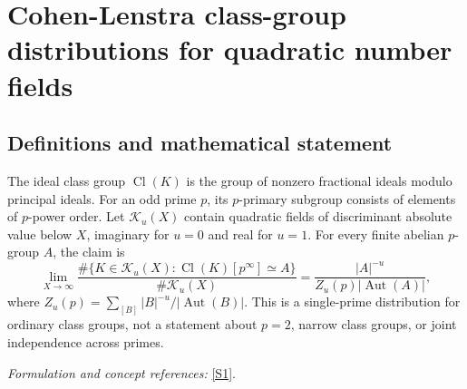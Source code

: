 \documentclass[11pt,a4paper]{article}
\newcommand{\sref}[2]{\hyperlink{source:#1:#2}{[S#2]}}
\newif\ifshowcatalogue
\newcommand{\cataloguescope}[1]{\ifshowcatalogue
 \paragraph{Exact scope in the supplied catalogue.}
 \begin{quote}\small #1\end{quote}\fi}
\numberwithin{equation}{section}
\begin{document}
\setcounter{section}{115}
\clearpage
\section{\texorpdfstring{Cohen-Lenstra class-group distributions for quadratic number fields}{Cohen-Lenstra class-group distributions for quadratic number fields}}\label{116}
\subsection{Definitions and mathematical statement}
The ideal class group $\operatorname{Cl}(K)$ is the group of nonzero fractional ideals modulo principal ideals. For an odd prime $p$, its $p$-primary subgroup consists of elements of $p$-power order. Let $\mathcal K_u(X)$ contain quadratic fields of discriminant absolute value below $X$, imaginary for $u=0$ and real for $u=1$. For every finite abelian $p$-group $A$, the claim is
\[
 \lim_{X\to\infty}\frac{\#\{K\in\mathcal K_u(X):\operatorname{Cl}(K)[p^\infty]\simeq A\}}
 {\#\mathcal K_u(X)}=\frac{|A|^{-u}}{Z_u(p)|\operatorname{Aut}(A)|},
\]
where $Z_u(p)=\sum_{[B]}|B|^{-u}/|\operatorname{Aut}(B)|$. This is a single-prime distribution for ordinary class groups, not a statement about $p=2$, narrow class groups, or joint independence across primes.
\par\smallskip\textit{Formulation and concept references:} \sref{116}{1}.
\cataloguescope{For u in \{0,1\} let K\_u(X) be the set of isomorphism classes of quadratic number fields K with |disc(K)| < X that are imaginary (u = 0) or real (u = 1). For each fixed odd prime p and each finite abelian p-group A, prove that the limit as X tends to infinity of \#\{K in K\_u(X) : Cl(K)[p\textasciicircum{}infinity] is isomorphic to A\} / \#K\_u(X) exists and equals (1/Z\_u(p)) * |A|\textasciicircum{}\{-u\} / |Aut(A)|, where Z\_u(p) is the sum over isomorphism classes of finite abelian p-groups B of |B|\textasciicircum{}\{-u\}/|Aut(B)| (so Z\_0(p) = prod\_\{i>=1\}(1-p\textasciicircum{}\{-i\})\textasciicircum{}\{-1\} and Z\_1(p) = prod\_\{i>=2\}(1-p\textasciicircum{}\{-i\})\textasciicircum{}\{-1\}). Cl(K) is the ordinary ideal class group and Cl(K)[p\textasciicircum{}infinity] its Sylow p-subgroup. No assertion is made for p = 2, for narrow class groups, for a joint law over several primes, or for any non-quadratic family.}
\end{document}
